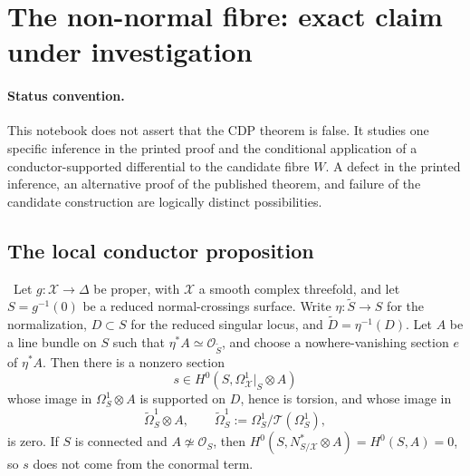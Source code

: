 \section{The non-normal fibre: exact claim under investigation}

\paragraph{Status convention.}
This notebook does not assert that the CDP theorem is false. It studies one
specific inference in the printed proof and the conditional application of a
conductor-supported differential to the candidate fibre $W$. A defect in the
printed inference, an alternative proof of the published theorem, and failure
of the candidate construction are logically distinct possibilities.

\subsection{The local conductor proposition}

\begin{proposition}
\Conditional\ Let $g:\mathcal X\to\Delta$ be proper, with $\mathcal X$ a
smooth complex threefold, and let $S=g^{-1}(0)$ be a reduced
normal-crossings surface. Write $\eta:\widetilde S\to S$ for the
normalization, $D\subset S$ for the reduced singular locus, and
$\widetilde D=\eta^{-1}(D)$. Let $A$ be a line bundle on $S$ such that
$\eta^*A\simeq\mathcal O_{\widetilde S}$, and choose a nowhere-vanishing
section $e$ of $\eta^*A$. Then there is a nonzero section
\[
 s\in H^0\!\left(S,\Omega^1_{\mathcal X}|_S\otimes A\right)
\]
whose image in $\Omega^1_S\otimes A$ is supported on $D$, hence is
torsion, and whose image in
\[
 \widetilde\Omega^1_S\otimes A,
 \qquad
 \widetilde\Omega^1_S:=\Omega^1_S/\mathcal T(\Omega^1_S),
\]
is zero. If $S$ is connected and $A\not\simeq\mathcal O_S$, then
$H^0(S,N^*_{S/\mathcal X}\otimes A)=H^0(S,A)=0$, so $s$ does not come
from the conormal term.
\end{proposition}


